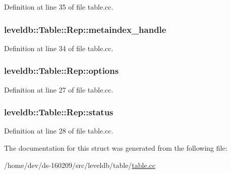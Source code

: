 Definition at line 35 of file table.\+cc.

\hypertarget{structleveldb_1_1_table_1_1_rep_a11500653a2db8ba301bca5027a508789}{}
\subsubsection[{metaindex\+\_\+handle}]{ leveldb\+::\+Table\+::\+Rep\+::metaindex\+\_\+handle}\label{structleveldb_1_1_table_1_1_rep_a11500653a2db8ba301bca5027a508789}


Definition at line 34 of file table.\+cc.

\hypertarget{structleveldb_1_1_table_1_1_rep_a96ff2b389369e1b0706b090961065740}{}
\subsubsection[{options}]{ leveldb\+::\+Table\+::\+Rep\+::options}\label{structleveldb_1_1_table_1_1_rep_a96ff2b389369e1b0706b090961065740}


Definition at line 27 of file table.\+cc.

\hypertarget{structleveldb_1_1_table_1_1_rep_aceaddad6024db9f34af2358503e4c089}{}
\subsubsection[{status}]{ leveldb\+::\+Table\+::\+Rep\+::status}\label{structleveldb_1_1_table_1_1_rep_aceaddad6024db9f34af2358503e4c089}


Definition at line 28 of file table.\+cc.



The documentation for this struct was generated from the following file\+:\begin{DoxyCompactItemize}
\item 
/home/dev/ds-\/160209/src/leveldb/table/\hyperlink{table_8cc}{table.\+cc}\end{DoxyCompactItemize}
